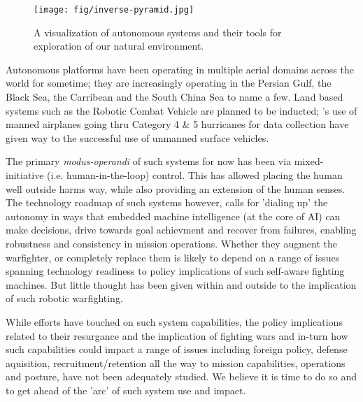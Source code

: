 \documentclass[11pt,letterpaper]{article}
\begin{document}
\begin{figure}  
  \centering 
  \texttt{[image: fig/inverse-pyramid.jpg]} 
  \caption{A visualization of autonomous systems and their tools for
    exploration of our natural environment.}
  \label{fig:inverse}
\end{figure}

Autonomous platforms have been operating in multiple aerial domains
across the world for sometime; they are increasingly operating in the
Persian Gulf, the Black Sea, the Carribean and the South China Sea to
name a few. Land based systems such as the Robotic Combat Vehicle are
planned to be inducted; \noae's use of manned airplanes going thru
Category 4 \& 5 hurricanes for data collection have given way to the
successful use of unmanned surface vehicles.

The primary \emph{modus-operandi} of such systems for now has been via
mixed-initiative (i.e. human-in-the-loop) control. This has allowed
placing the human well outside harms way, while also providing an
extension of the human senses. The technology roadmap of such systems
however, calls for 'dialing up' the autonomy in ways that embedded
machine intelligence (at the core of AI) can make decisions, drive
towards goal achievment and recover from failures, enabling robustness
and consistency in mission operations. Whether they augment the
warfighter, or completely replace them is likely to depend on a range
of issues spanning technology readiness to policy implications of such
self-aware fighting machines. But little thought has been given within
and outside \org to the implication of such robotic warfighting. 

While \org efforts have touched on such system capabilities, the
policy implications related to their resurgance and the implication of
fighting wars and in-turn how such capabilities could impact a range
of issues including foreign policy, defense aquisition,
recruitment/retention all the way to mission capabilities, operations
and posture, have not been adequately studied. We believe it is time
to do so and to get ahead of the 'arc' of such system use and impact.
 
\end{document}
